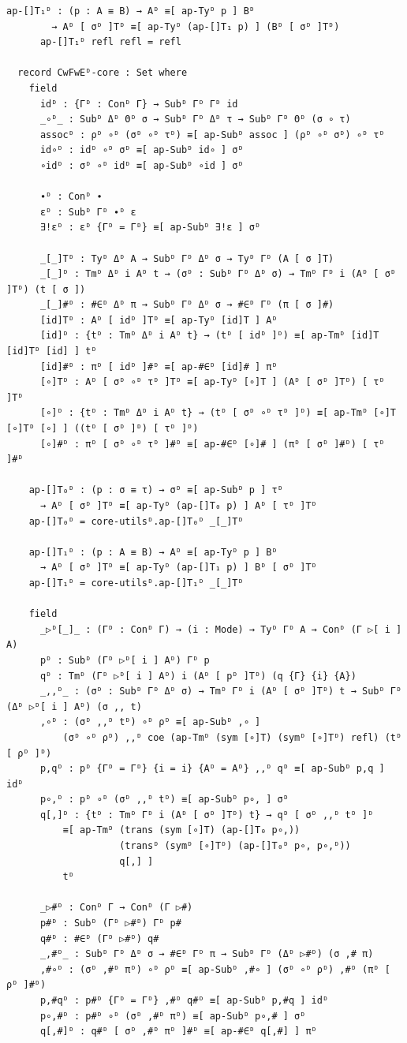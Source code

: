 {\begin{Verbatim}[breaklines=true,breakanywhere=true,fontsize=\scriptsize]
      ap-[]T₁ᴰ : (p : A ≡ B) → Aᴰ ≡[ ap-Tyᴰ p ] Bᴰ
        → Aᴰ [ σᴰ ]Tᴰ ≡[ ap-Tyᴰ (ap-[]T₁ p) ] (Bᴰ [ σᴰ ]Tᴰ)
      ap-[]T₁ᴰ refl refl = refl

  record CwFwEᴰ-core : Set where
    field
      idᴰ : {Γᴰ : Conᴰ Γ} → Subᴰ Γᴰ Γᴰ id
      _∘ᴰ_ : Subᴰ Δᴰ Θᴰ σ → Subᴰ Γᴰ Δᴰ τ → Subᴰ Γᴰ Θᴰ (σ ∘ τ)
      assocᴰ : ρᴰ ∘ᴰ (σᴰ ∘ᴰ τᴰ) ≡[ ap-Subᴰ assoc ] (ρᴰ ∘ᴰ σᴰ) ∘ᴰ τᴰ
      id∘ᴰ : idᴰ ∘ᴰ σᴰ ≡[ ap-Subᴰ id∘ ] σᴰ
      ∘idᴰ : σᴰ ∘ᴰ idᴰ ≡[ ap-Subᴰ ∘id ] σᴰ

      ∙ᴰ : Conᴰ ∙
      εᴰ : Subᴰ Γᴰ ∙ᴰ ε
      ∃!εᴰ : εᴰ {Γᴰ = Γᴰ} ≡[ ap-Subᴰ ∃!ε ] σᴰ

      _[_]Tᴰ : Tyᴰ Δᴰ A → Subᴰ Γᴰ Δᴰ σ → Tyᴰ Γᴰ (A [ σ ]T)
      _[_]ᴰ : Tmᴰ Δᴰ i Aᴰ t → (σᴰ : Subᴰ Γᴰ Δᴰ σ) → Tmᴰ Γᴰ i (Aᴰ [ σᴰ ]Tᴰ) (t [ σ ])
      _[_]#ᴰ : #∈ᴰ Δᴰ π → Subᴰ Γᴰ Δᴰ σ → #∈ᴰ Γᴰ (π [ σ ]#)
      [id]Tᴰ : Aᴰ [ idᴰ ]Tᴰ ≡[ ap-Tyᴰ [id]T ] Aᴰ
      [id]ᴰ : {tᴰ : Tmᴰ Δᴰ i Aᴰ t} → (tᴰ [ idᴰ ]ᴰ) ≡[ ap-Tmᴰ [id]T [id]Tᴰ [id] ] tᴰ
      [id]#ᴰ : πᴰ [ idᴰ ]#ᴰ ≡[ ap-#∈ᴰ [id]# ] πᴰ
      [∘]Tᴰ : Aᴰ [ σᴰ ∘ᴰ τᴰ ]Tᴰ ≡[ ap-Tyᴰ [∘]T ] (Aᴰ [ σᴰ ]Tᴰ) [ τᴰ ]Tᴰ
      [∘]ᴰ : {tᴰ : Tmᴰ Δᴰ i Aᴰ t} → (tᴰ [ σᴰ ∘ᴰ τᴰ ]ᴰ) ≡[ ap-Tmᴰ [∘]T [∘]Tᴰ [∘] ] ((tᴰ [ σᴰ ]ᴰ) [ τᴰ ]ᴰ)
      [∘]#ᴰ : πᴰ [ σᴰ ∘ᴰ τᴰ ]#ᴰ ≡[ ap-#∈ᴰ [∘]# ] (πᴰ [ σᴰ ]#ᴰ) [ τᴰ ]#ᴰ

    ap-[]T₀ᴰ : (p : σ ≡ τ) → σᴰ ≡[ ap-Subᴰ p ] τᴰ
      → Aᴰ [ σᴰ ]Tᴰ ≡[ ap-Tyᴰ (ap-[]T₀ p) ] Aᴰ [ τᴰ ]Tᴰ
    ap-[]T₀ᴰ = core-utilsᴰ.ap-[]T₀ᴰ _[_]Tᴰ

    ap-[]T₁ᴰ : (p : A ≡ B) → Aᴰ ≡[ ap-Tyᴰ p ] Bᴰ
      → Aᴰ [ σᴰ ]Tᴰ ≡[ ap-Tyᴰ (ap-[]T₁ p) ] Bᴰ [ σᴰ ]Tᴰ
    ap-[]T₁ᴰ = core-utilsᴰ.ap-[]T₁ᴰ _[_]Tᴰ

    field
      _▷ᴰ[_]_ : (Γᴰ : Conᴰ Γ) → (i : Mode) → Tyᴰ Γᴰ A → Conᴰ (Γ ▷[ i ] A)
      pᴰ : Subᴰ (Γᴰ ▷ᴰ[ i ] Aᴰ) Γᴰ p
      qᴰ : Tmᴰ (Γᴰ ▷ᴰ[ i ] Aᴰ) i (Aᴰ [ pᴰ ]Tᴰ) (q {Γ} {i} {A})
      _,,ᴰ_ : (σᴰ : Subᴰ Γᴰ Δᴰ σ) → Tmᴰ Γᴰ i (Aᴰ [ σᴰ ]Tᴰ) t → Subᴰ Γᴰ (Δᴰ ▷ᴰ[ i ] Aᴰ) (σ ,, t)
      ,∘ᴰ : (σᴰ ,,ᴰ tᴰ) ∘ᴰ ρᴰ ≡[ ap-Subᴰ ,∘ ]
          (σᴰ ∘ᴰ ρᴰ) ,,ᴰ coe (ap-Tmᴰ (sym [∘]T) (symᴰ [∘]Tᴰ) refl) (tᴰ [ ρᴰ ]ᴰ)
      p,qᴰ : pᴰ {Γᴰ = Γᴰ} {i = i} {Aᴰ = Aᴰ} ,,ᴰ qᴰ ≡[ ap-Subᴰ p,q ] idᴰ
      p∘,ᴰ : pᴰ ∘ᴰ (σᴰ ,,ᴰ tᴰ) ≡[ ap-Subᴰ p∘, ] σᴰ
      q[,]ᴰ : {tᴰ : Tmᴰ Γᴰ i (Aᴰ [ σᴰ ]Tᴰ) t} → qᴰ [ σᴰ ,,ᴰ tᴰ ]ᴰ
          ≡[ ap-Tmᴰ (trans (sym [∘]T) (ap-[]T₀ p∘,))
                    (transᴰ (symᴰ [∘]Tᴰ) (ap-[]T₀ᴰ p∘, p∘,ᴰ))
                    q[,] ]
          tᴰ

      _▷#ᴰ : Conᴰ Γ → Conᴰ (Γ ▷#)
      p#ᴰ : Subᴰ (Γᴰ ▷#ᴰ) Γᴰ p#
      q#ᴰ : #∈ᴰ (Γᴰ ▷#ᴰ) q#
      _,#ᴰ_ : Subᴰ Γᴰ Δᴰ σ → #∈ᴰ Γᴰ π → Subᴰ Γᴰ (Δᴰ ▷#ᴰ) (σ ,# π)
      ,#∘ᴰ : (σᴰ ,#ᴰ πᴰ) ∘ᴰ ρᴰ ≡[ ap-Subᴰ ,#∘ ] (σᴰ ∘ᴰ ρᴰ) ,#ᴰ (πᴰ [ ρᴰ ]#ᴰ)
      p,#qᴰ : p#ᴰ {Γᴰ = Γᴰ} ,#ᴰ q#ᴰ ≡[ ap-Subᴰ p,#q ] idᴰ
      p∘,#ᴰ : p#ᴰ ∘ᴰ (σᴰ ,#ᴰ πᴰ) ≡[ ap-Subᴰ p∘,# ] σᴰ
      q[,#]ᴰ : q#ᴰ [ σᴰ ,#ᴰ πᴰ ]#ᴰ ≡[ ap-#∈ᴰ q[,#] ] πᴰ


\end{Verbatim}}
